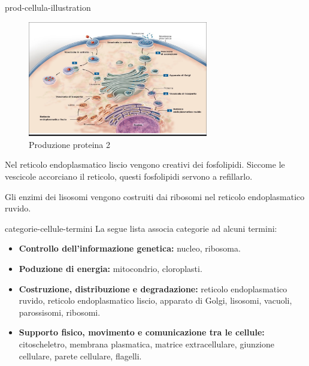 \documentclass[preview]{standalone}
\begin{document}
\begin{snippet}{prod-cellula-illustration}
    \setlength{\intextsep}{0pt}%
    \begin{figure}
        \includegraphics[width=0.7\textwidth]{./resources/prod_cellula.png}
        \caption{Produzione proteina 2}
        \vspace{-1cm}
    \end{figure}
    
    Nel reticolo endoplasmatico liscio vengono creativi dei fosfolipidi.
    Siccome le vescicole accorciano il reticolo, questi fosfolipidi servono a refillarlo.
    
    Gli enzimi dei lisosomi vengono costruiti dai ribosomi nel reticolo endoplasmatico ruvido.
    
    \wrapfill
\end{snippet}

\begin{snippet}{categorie-cellule-termini}
    La segue lista associa categorie ad alcuni termini:
    \begin{itemize}
        \item \textbf{Controllo dell'informazione genetica:}
            nucleo, ribosoma.
        \item \textbf{Poduzione di energia:}
            mitocondrio, cloroplasti.
        \item \textbf{Costruzione, distribuzione e degradazione:}
            reticolo endoplasmatico ruvido,
            reticolo endoplasmatico liscio, apparato di Golgi,
            lisosomi, vacuoli, parossisomi, ribosomi.
        \item \textbf{Supporto fisico, movimento e comunicazione tra le cellule:}
            citoscheletro, membrana plasmatica, matrice extracellulare,
            giunzione cellulare, parete cellulare, flagelli.
    \end{itemize}
\end{snippet}
\end{document}
